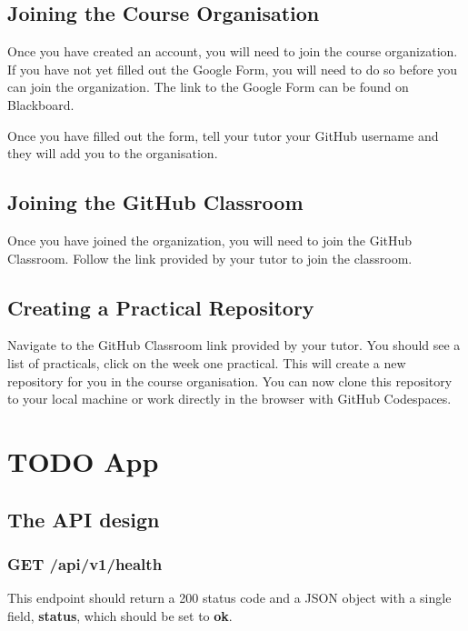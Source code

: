 \documentclass{csse4400}
\begin{document}
\subsection{Joining the Course Organisation}
Once you have created an account, you will need to join the course organization.
If you have not yet filled out the Google Form,
you will need to do so before you can join the organization.
The link to the Google Form can be found on Blackboard.

Once you have filled out the form,
tell your tutor your GitHub username and they will add you to the organisation.

\subsection{Joining the GitHub Classroom}
Once you have joined the organization,
you will need to join the GitHub Classroom.
Follow the link provided by your tutor to join the classroom.

\subsection{Creating a Practical Repository}
Navigate to the GitHub Classroom link provided by your tutor.
You should see a list of practicals, click on the week one practical.
This will create a new repository for you in the course organisation.
You can now clone this repository to your local machine or work directly in the browser with GitHub Codespaces.


\section{TODO App}

\subsection{The API design}

\subsubsection{GET /api/v1/health}
This endpoint should return a 200 status code and a JSON object with a single field, \textbf{status}, which should be set to \textbf{ok}.
\end{document}
